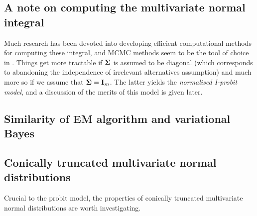 \subsection{A note on computing the multivariate normal integral}
\label{misc:mnint}


Much research has been devoted into developing efficient computational methods for computing these integral, and MCMC methods seem to be the tool of choice in \citep{mcculloch1994exact,nobile1998hybrid,mcculloch2000bayesian}.
Things get more tractable if ${\bm\Sigma}$ is assumed to be diagonal (which corresponds to abandoning the independence of irrelevant alternatives assumption) and much more so if we assume that ${\bm\Sigma} = {\mathbf I}_m$.
The latter yields the \emph{normalised I-probit model}, and a discussion of the merits of this model is given later.




\subsection{Similarity of EM algorithm and variational Bayes}



\subsection{Conically truncated multivariate normal distributions}

Crucial to the probit model, the properties of conically truncated multivariate normal distributions are worth investigating.

